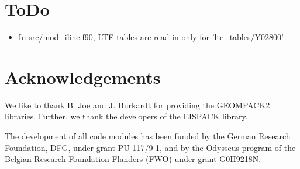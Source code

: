 \documentclass[10pt,a4paper]{article}
\begin{document}
\section{ToDo}
\begin{itemize}
\item In src/mod\_iline.f90, LTE tables are read in only for 'lte\_tables/Y02800'
\end{itemize}


\section{Acknowledgements}
We like to thank B. Joe and J. Burkardt for providing the GEOMPACK2 libraries.
Further, we thank the developers of the EISPACK library.

The development of all code modules has been funded by the German
Research Foundation, DFG, under grant PU 117/9-1, and by the Odysseus
program of the Belgian Research Foundation Flanders (FWO) under grant
G0H9218N.








\end{document}
